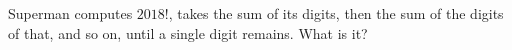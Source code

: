 Superman computes $2018!$, takes the sum of its digits, then the sum of the digits of that, and so on, until a single digit remains. What is it?
